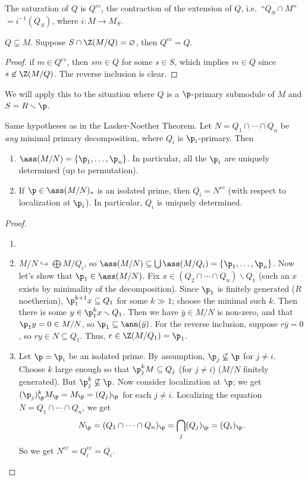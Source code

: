  \begin{exercise}
   The saturation of $Q$ is $Q^{ec}$, the contraction of the extension of $Q$, i.e.\
   ``$Q_S\cap M$''$=i^{-1}(Q_S)$, where $i:M\to M_S$.
 \end{exercise}
 \begin{lemma}
   $Q\subsetneq M$. Suppose $S\cap \Z(M/Q)=\varnothing$, then $Q^{ec}=Q$.
 \end{lemma}
 \begin{proof}
   if $m\in Q^{ec}$, then $sm\in Q$ for some $s\in S$, which implies $m\in Q$ since
   $s\not\in \Z(M/Q)$. The reverse inclusion is clear.
 \end{proof}
 We will apply this to the situation where $Q$ is a $\p$-primary submodule of $M$ and
 $S=R\smallsetminus \p$.

 \begin{theorem}
   Same hypotheses as in the Lasker-Noether Theorem. Let $N=Q_1\cap \cdots \cap Q_n$ be
   \emph{any} minimal primary decomposition, where $Q_i$ is $\p_i$-primary. Then
   \begin{enumerate}
     \item $\ass (M/N) = \{\p_1,\dots, \p_n\}$. In particular, all the $\p_i$ are
     uniquely determined (up to permutation).

     \item If $\p\in \ass (M/N)_*$ is an isolated prime, then $Q_i=N^{ec}$ (with respect
     to localization at $\p_i$). In particular, $Q_i$ is uniquely determined.
   \end{enumerate}
 \end{theorem}
 \begin{proof}
  \begin{enumerate}
   \item[]
   \item
   $M/N\hookrightarrow \bigoplus M/Q_i$, so
   $\ass(M/N)\subseteq \bigcup \ass (M/Q_i) = \{\p_1,\dots, \p_n\}$.
   Now let's show that $\p_1\in \ass (M/N)$. Fix $x\in
   (Q_2\cap\cdots \cap Q_n)\smallsetminus Q_1$ (such an $x$ exists by minimality of the
   decomposition). Since $\p_1$ is finitely generated ($R$ noetherian),
   $\p_1^{k+1}x\subseteq Q_1$ for some $k\gg 1$; choose the minimal such $k$. Then there
   is some $y\in \p_1^k x\smallsetminus Q_1$. Then we have $\bar y \in M/N$ is non-zero,
   and that $\p_1 y=0\in M/N$, so $\p_1\subseteq \ann (\bar y)$. For the reverse
   inclusion, suppose $r\bar y=0$, so $ry\in N\subseteq Q_1$. Thus, $r\in
   \Z(M/Q_1)=\p_1$.

   \item Let $\p=\p_i$ be an isolated prime. By assumption, $\p_j\not\subseteq \p$ for
   $j\neq i$. Choose $k$ large enough so that $\p_j^k M\subseteq Q_j$ (for $j\neq i$)
   ($M/N$ finitely generated). But $\p_j^k\not\subseteq \p$. Now consider localization at
   $\p$; we get $(\p_j)_{\p}^k M_\p = M_\p = (Q_j)_\p$ for each $j\neq i$. Localizing the
   equation $N=Q_1\cap \cdots \cap Q_n$, we get
   \[
    N_\p=(Q_1\cap \cdots \cap Q_n)_\p = \bigcap_j (Q_j)_\p = (Q_i)_\p.
   \]
   So we get $N^{ec}=Q_i^{ec} = Q_i$.\qedhere
  \end{enumerate}
 \end{proof}

